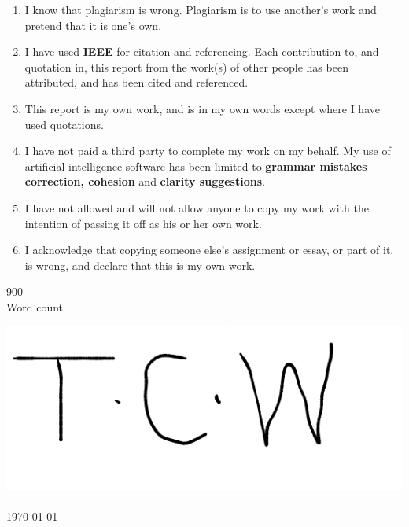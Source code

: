 {}

\begin{enumerate}
  \item I know that plagiarism is wrong. Plagiarism is to use another's work and pretend that it is one's own.
  \item I have used \textbf{IEEE} for citation and referencing. Each contribution to, and quotation in, this report from the work(s) of other people has been attributed, and has been cited and referenced.
  \item This report is my own work, and is in my own words except where I have used quotations.
  \item I have not paid a third party to complete my work on my behalf. My use of artificial intelligence software has been limited to \textbf{grammar mistakes correction, cohesion} and \textbf{clarity suggestions}.
  \item I have not allowed and will not allow anyone to copy my work with the intention of passing it off as his or her own work.
  \item I acknowledge that copying someone else’s assignment or essay, or part of it, is wrong, and declare that this is my own work.
\end{enumerate}

    \vspace{15mm}

    \begin{minipage}[t]{0.45\textwidth}
      900\\
      Word count
  \end{minipage}%
  \hfill
  \begin{minipage}[t]{0.45\textwidth}
      \includegraphics[width=0.3\linewidth]{2_Preface/Travimadox.png}\\[1ex]%
      \Author\\
      \today
  \end{minipage}
    
    \vfill\vfill\vfill

